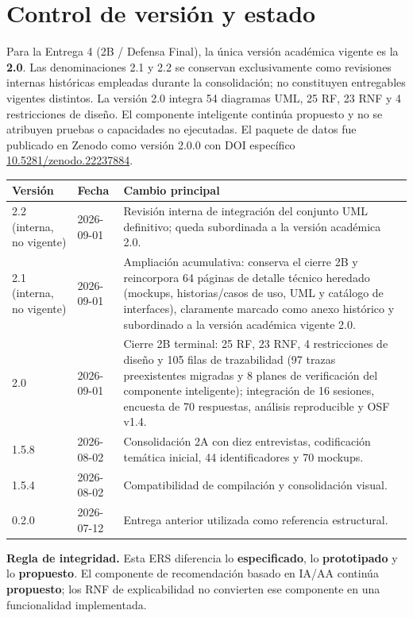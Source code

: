 \documentclass[11pt,a4paper,twoside]{article}
\newcommand{\zenododoi}{\href{https://doi.org/10.5281/zenodo.22237884}{10.5281/zenodo.22237884}}
\begin{document}
\tableofcontents
\listoffigures
\listoftables
\newpage

\section{Control de versión y estado}
Para la Entrega 4 (2B / Defensa Final), la única versión académica vigente es la \textbf{2.0}. Las denominaciones 2.1 y 2.2 se conservan exclusivamente como revisiones internas históricas empleadas durante la consolidación; no constituyen entregables vigentes distintos. La versión 2.0 integra 54 diagramas UML, 25 RF, 23 RNF y 4 restricciones de diseño. El componente inteligente continúa propuesto y no se atribuyen pruebas o capacidades no ejecutadas. El paquete de datos fue publicado en Zenodo como versión 2.0.0 con DOI específico \zenododoi.

\begin{tabularx}{\textwidth}{p{2cm}p{2.4cm}X}\toprule
Versión & Fecha & Cambio principal \\ \midrule
2.2 (interna, no vigente) & 2026-09-01 & Revisión interna de integración del conjunto UML definitivo; queda subordinada a la versión académica 2.0.\\
2.1 (interna, no vigente) & 2026-09-01 & Ampliación acumulativa: conserva el cierre 2B y reincorpora 64 páginas de detalle técnico heredado (mockups, historias/casos de uso, UML y catálogo de interfaces), claramente marcado como anexo histórico y subordinado a la versión académica vigente 2.0.\\
2.0 & 2026-09-01 & Cierre 2B terminal: 25 RF, 23 RNF, 4 restricciones de diseño y 105 filas de trazabilidad (97 trazas preexistentes migradas y 8 planes de verificación del componente inteligente); integración de 16 sesiones, encuesta de 70 respuestas, análisis reproducible y OSF v1.4.\\
1.5.8 & 2026-08-02 & Consolidación 2A con diez entrevistas, codificación temática inicial, 44 identificadores y 70 mockups.\\
1.5.4 & 2026-08-02 & Compatibilidad de compilación y consolidación visual.\\
0.2.0 & 2026-07-12 & Entrega anterior utilizada como referencia estructural.\\
\bottomrule\end{tabularx}

\begin{importantbox}
\textbf{Regla de integridad.} Esta ERS diferencia lo \textbf{especificado}, lo \textbf{prototipado} y lo \textbf{propuesto}. El componente de recomendación basado en IA/AA continúa \textbf{propuesto}; los RNF de explicabilidad no convierten ese componente en una funcionalidad implementada.
\end{importantbox}
\end{document}
